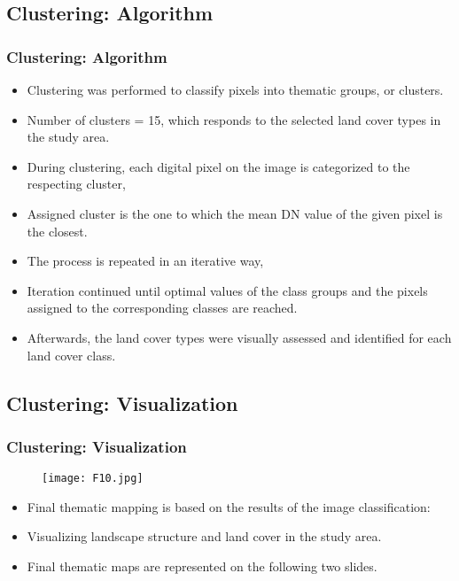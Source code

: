 \documentclass[pdflatex,compress,8pt,
	xcolor={dvipsnames,dvipsnames,svgnames,x11names,table},
	hyperref={colorlinks = true,
	breaklinks = true, 
	urlcolor = NavyBlue, 
	breaklinks = true}]{beamer}
\begin{document}
\subsection{Clustering: Algorithm}
\begin{frame}\frametitle{Clustering: Algorithm}
\begin{itemize}
	\item Clustering was performed to classify pixels into thematic groups, or clusters.
	\item Number of clusters = 15, which responds to the selected land cover types in the study area.
	\item During clustering, each digital pixel on the image is categorized to the respecting cluster, 
	 \item Assigned cluster is the one to which the mean DN value of the given pixel is the closest.
	\item The process is repeated in an iterative way, 
	\item Iteration continued until optimal values of the class groups and the pixels assigned to the corresponding classes are reached.
	\item Afterwards, the land cover types were visually assessed and identified for each land cover class.
\end{itemize}
\end{frame}

\subsection{Clustering: Visualization}
\begin{frame}\frametitle{Clustering: Visualization}
\begin{figure}[H]
	\centering
		\texttt{[image: F10.jpg]}
\end{figure}
\begin{itemize}
	\item Final thematic mapping is based on the results of the image classification: 
	\item Visualizing landscape structure and land cover in the study area.
	\item Final thematic maps are represented on the following two slides.
\end{itemize}
\end{frame}
\end{document}
